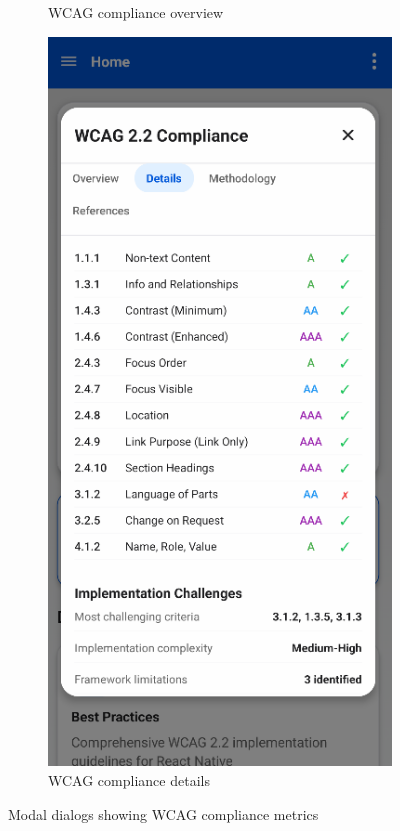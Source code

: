 \begin{figure}[ht]
\begin{subfigure}[b]{0.48\textwidth}
        \caption{WCAG compliance overview}
        \label{fig:wcag-compliance-modal}
    \end{subfigure}
    \hfill
    \begin{subfigure}[b]{0.48\textwidth}
        \centering
        \includegraphics[width=\linewidth]{img/wcag-compliance-details.png}
        \caption{WCAG compliance details}
        \label{fig:wcag-details-modal}
    \end{subfigure}
    \caption{Modal dialogs showing WCAG compliance metrics}
    \label{fig:wcag_modal_pair}
\end{figure}

